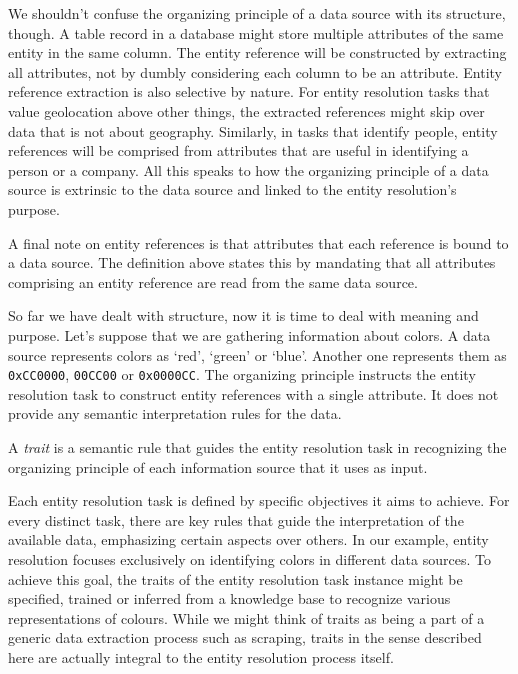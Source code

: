 \documentclass[journal]{IEEEtran}
\begin{document}
    We shouldn't confuse the organizing principle of a data source with its
    structure, though.
    A table record in a database might store multiple attributes of the same
    entity in the same column.
    The entity reference will be constructed by extracting all attributes, not
    by dumbly considering each column to be an attribute.
    Entity reference extraction is also selective by nature.
    For entity resolution tasks that value geolocation above other things, the
    extracted references might skip over data that is not about geography.
    Similarly, in tasks that identify people, entity references will be
    comprised from attributes that are useful in identifying a person or a
    company.
    All this speaks to how the organizing principle of a data source is
    extrinsic to the data source and linked to the entity resolution's purpose.

    A final note on entity references is that attributes that each reference is
    bound to a data source.
    The definition above states this by mandating that all attributes comprising
    an entity reference are read from the same data source.

    So far we have dealt with structure, now it is time to deal with meaning and
    purpose.    
    Let's suppose that we are gathering information about colors.
    A data source represents colors as `red', `green' or `blue'.
    Another one represents them as \texttt{0xCC0000}, \texttt{00CC00} or
    \texttt{0x0000CC}.
    The organizing principle instructs the entity resolution task to construct
    entity references with a single attribute.
    It does not provide any semantic interpretation rules for the data.
    
    \begin{defn}
        A \textit{trait} is a semantic rule that guides the entity resolution
        task in recognizing the organizing principle of each information source
        that it uses as input.
    \end{defn}

    Each entity resolution task is defined by specific objectives it aims to
    achieve.
    For every distinct task, there are key rules that guide the interpretation
    of the available data, emphasizing certain aspects over others.
    In our example, entity resolution focuses exclusively on identifying colors
    in different data sources.
    To achieve this goal, the traits of the entity resolution task instance
    might be specified, trained or inferred from a knowledge base to recognize
    various representations of colours.
    While we might think of traits as being a part of a generic data extraction
    process such as scraping, traits in the sense described here are actually
    integral to the entity resolution process itself.
    
\end{document}
